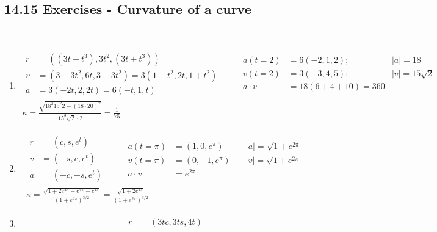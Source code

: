 \documentclass[twoside]{amsart}
\theoremstyle{plain}
\theoremstyle{definition}
\newcommand{\exercisehead}[1]
  {\smallskip
   \noindent{\small\bf Exercise #1.}}
\begin{document}
\subsection*{ 14.15 Exercises - Curvature of a curve }
\quad \\
\exercisehead{1}
\begin{enumerate}
\item \[
\begin{gathered}
  \begin{aligned}
    r & = ((3t-t^3), 3t^2,(3t+t^3)) \\
    v & = (3-3t^2, 6t, 3+3t^2) = 3(1-t^2, 2t, 1+t^2) \\
    a & = 3(-2t,2,2t) = 6(-t,1,t) 
  \end{aligned} \quad \quad \,
  \begin{aligned}
    a (t=2) &  = 6(-2,1,2); \quad & |a| = 18 \\
    v(t=2) & = 3(-3,4,5); \quad & |v| = 15\sqrt{2} \\
    a\cdot v & = 18(6+4+10) = 360 
  \end{aligned}\\ 
  \kappa = \frac{ \sqrt{ 18^2 15^2 2 - (18\cdot 20)^2 } }{ 15^3 \sqrt{2} \cdot 2 } = \boxed{ \frac{1}{75 } }
\end{gathered}
\]
\item \[
\begin{gathered}
  \begin{aligned}
    r & = (c,s,e^t) \\
    v & = (-s,c,e^t) \\
    a & = (-c,-s,e^t)
  \end{aligned} \quad \quad \, 
\begin{aligned}
  a(t=\pi) & = (1,0,e^{\pi}) \quad & |a| = \sqrt{ 1 + e^{2\pi} } \\
  v(t=\pi) & = (0,-1,e^{\pi}) \quad & |v| = \sqrt{ 1 + e^{2\pi} } \\
  a\cdot v & = e^{2\pi }
\end{aligned} \\
\kappa = \frac{ \sqrt{ 1 + 2 e^{2\pi } + e^{4\pi} - e^{4\pi} } }{ (1+ e^{2\pi} )^{3/2} } = \boxed{ \frac{ \sqrt{ 1 + 2e^{2\pi }} }{ (1+e^{2\pi})^{3/2} } }
\end{gathered}
\]
\item \[
\begin{gathered}
  \begin{aligned}
    r & = (3tc,3ts,4t) \\

\end{aligned}
\end{gathered}\]
\end{enumerate}
\end{document}
